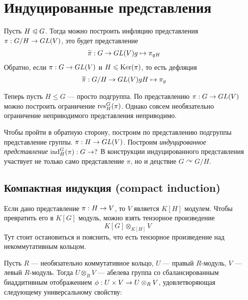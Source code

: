 

\section{Индуцированные представления}
Пусть $H \trianglelefteqslant G$.
Тогда можно построить инфляцию представления $\pi: G/H \rightarrow GL(V)$, это будет представление \begin{align*}
                                                                                                \widetilde{\pi}: G &\rightarrow GL(V)g \mapsto \pi_{gH}
\end{align*}
Обратно, если $\pi: G \rightarrow GL(V)$ и $H \leqslant \operatorname{Ker}(\pi)$, то есть дефляция \begin{align*}
                                                                            \widetilde{\pi}: G/H &\rightarrow GL(V)gH \mapsto \pi_{g}
\end{align*}

Теперь пусть $H \le G$ --- просто подгруппа.
По представлению $\pi: G \rightarrow GL(V)$ можно построить ограничение $\operatorname{res}^G_H(\pi)$.
Однако совсем необязательно ограничение неприводимого представления неприводимо.

Чтобы пройти в обратную сторону, построим по представлению подгруппы представление группы. $\pi: H \rightarrow GL(V)$.
Построим \emph{индуцированное представление} $\operatorname{ind}_H^G(\pi): G \rightarrow ?$
В конструкции индуцированного представления участвует не только само представление $\pi$, но и децствие $G \curvearrowright G/H$.

\subsection{Компактная индукция (compact induction)}
Если дано представление $\pi: H \rightarrow V$, то $V$ является $K[H]$ модулем.
Чтобы превратить его в $K[G]$ модуль, можно взять тензорное произведение
\[K[G] \otimes_{K[H]} V\]
Тут стоит остановиться и пояснить, что есть тензорное произведение над некоммутативным кольцом.

Пусть $R$ --- необязательно коммутативное кольцо, $U$ --- правый $R$-модуль, $V$ --- левый $R$-модуль.
Тогда $U \otimes_R V$ --- абелева группа со сбалансированным биаддитивным отображением $\phi: U \times V \rightarrow U \otimes_R V$, удовлетворяющая следующему универсальному свойству:

